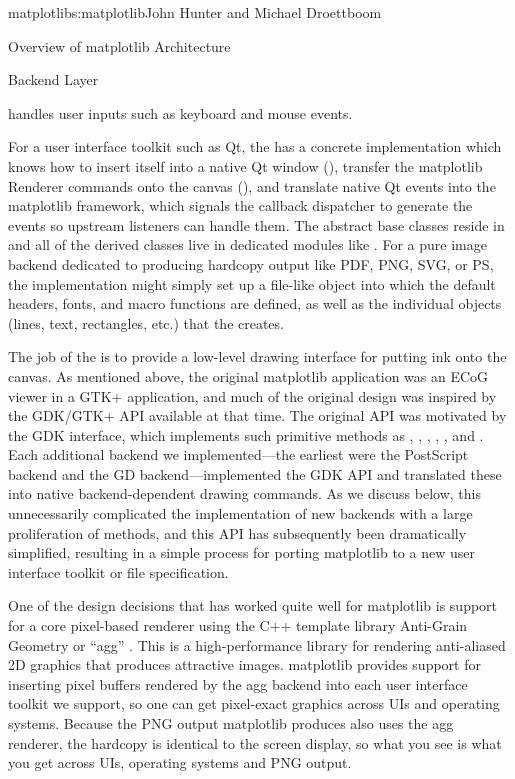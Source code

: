 \begin{aosachapter}{matplotlib}{s:matplotlib}{John Hunter and Michael Droettboom}
\begin{aosasect1}{Overview of matplotlib Architecture}
\begin{aosasect2}{Backend Layer}
\begin{aosaitemize}
\item {} handles user inputs such as keyboard and mouse events.
\end{aosaitemize}

For a user interface toolkit such as Qt, the  has a
concrete implementation which knows how to insert itself into a native
Qt window (), transfer the matplotlib Renderer
commands onto the canvas (), and translate native
Qt events into the matplotlib  framework, which signals the
callback dispatcher to generate the events so upstream listeners can
handle them.  The abstract base classes reside in
 and all of the derived classes live
in dedicated modules like .
For a pure image backend dedicated to producing hardcopy output like
PDF, PNG, SVG, or PS, the  implementation might
simply set up a file-like object into which the default headers,
fonts, and macro functions are defined, as well as the individual
objects (lines, text, rectangles, etc.) that the  creates.

The job of the  is to provide a low-level drawing
interface for putting ink onto the canvas.  As mentioned above, the
original matplotlib application was an ECoG viewer in a GTK+
application, and much of the original design was inspired by the
GDK/GTK+ API available at that time.  The original  API
was motivated by the GDK  interface, which implements
such primitive methods as , ,
, , , and
.  Each additional backend we implemented---the
earliest were the PostScript backend and the GD backend---implemented
the GDK  API and translated these into native 
backend-dependent drawing commands.  As we discuss below, this unnecessarily
complicated the implementation of new backends with a large
proliferation of methods, and this API has subsequently been
dramatically simplified, resulting in a simple process for porting
matplotlib to a new user interface toolkit or file specification.

One of the design decisions that has worked quite well for matplotlib
is support for a core pixel-based renderer using the C++ template
library Anti-Grain Geometry or ``agg'' \cite{bib:agg}.  This is a
high-performance library for rendering anti-aliased 2D graphics that
produces attractive images.  matplotlib provides support for inserting
pixel buffers rendered by the agg backend into each user interface
toolkit we support, so one can get pixel-exact graphics across UIs and
operating systems.  Because the PNG output matplotlib produces also
uses the agg renderer, the hardcopy is identical to the screen
display, so what you see is what you get across UIs, operating systems
and PNG output.


\end{aosasect2}
\end{aosasect1}
\end{aosachapter}
